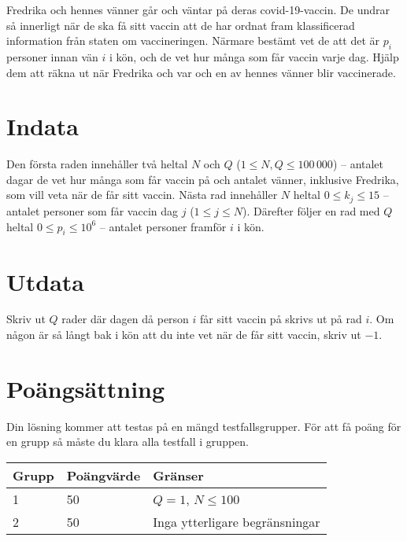 
Fredrika och hennes vänner går och väntar på deras covid-19-vaccin. De undrar så innerligt när de ska få sitt vaccin att de har ordnat fram klassificerad information från staten om vaccineringen. Närmare bestämt vet de att det är $p_i$ personer innan vän $i$ i kön, och de vet hur många som får vaccin varje dag. Hjälp dem att räkna ut när Fredrika och var och en av hennes vänner blir vaccinerade. 

\section*{Indata}
Den första raden innehåller två heltal $N$ och $Q$ ($1 \le N,Q \le 100\,000$) --  antalet dagar de vet hur många som får vaccin på och antalet vänner, inklusive Fredrika, som vill veta när de får sitt vaccin. Nästa rad innehåller $N$ heltal $0 \le k_j \le 15$ -- antalet personer som får vaccin dag $j$ ($1 \le j \le N$). Därefter följer en rad med $Q$ heltal $0 \le p_i \le 10^6$ -- antalet personer framför $i$ i kön.

\section*{Utdata}
Skriv ut $Q$ rader där dagen då person $i$ får sitt vaccin på skrivs ut på rad $i$. Om någon är så långt bak i kön att du inte vet när de får sitt vaccin, skriv ut $-1$.
\section*{Poängsättning}
Din lösning kommer att testas på en mängd testfallsgrupper.
För att få poäng för en grupp så måste du klara alla testfall i gruppen.

\noindent
\begin{tabular}{| l | l | l |}
  \hline
  Grupp & Poängvärde & Gränser \\ \hline
  1 & 50 & $Q=1$, $N \le 100$ \\ \hline
  2 & 50 & Inga ytterligare begränsningar  \\ \hline
\end{tabular}
